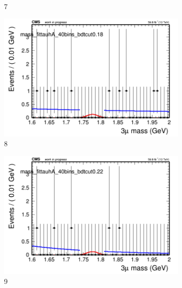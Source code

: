 \begin{figure}[h!]
\begin{subfigure}{0.2\textwidth}
        \caption{7}
    \end{subfigure}
    \begin{subfigure}{0.2\textwidth}
        \includegraphics[width=\textwidth]{power_law/plots/tauhA/massfit_tauhA_40bins_bdtcut0.18.png}
        \caption{8}
    \end{subfigure}
    \begin{subfigure}{0.2\textwidth}
        \includegraphics[width=\textwidth]{power_law/plots/tauhA/massfit_tauhA_40bins_bdtcut0.22.png}
        \caption{9}
    \end{subfigure}
    \begin{subfigure}{0.2\textwidth}

\end{subfigure}
\end{figure}
